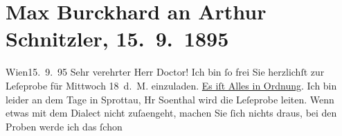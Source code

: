

         
         \renewcommand{\erwaehntePersonen}{Personen: Anna Bauer, Giuseppe Giacosa, Adolf von Sonnenthal, Fanny Walbeck}
         \renewcommand{\erwaehnteInstitutionen}{Institutionen: Burgtheater}
         \renewcommand{\erwaehnteOrte}{Orte: Sprottau, Wien}
         \renewcommand{\erwaehnteWerke}{Werke: Liebelei. Schauspiel in drei Akten, Rechte der Seele. Schauspiel in einem Act}
               \section[Max Burckhard an Arthur Schnitzler, 15. 9. 1895]{ Max Burckhard an Arthur Schnitzler, 15. 9. 1895}\nopagebreak{}\rehead{ }\begin{ledgroupsized}[t]{13cm}\normalsize\beginnumbering \toendnotes[C]{\smallbreak\pagebreak[2]} 
\toendnotes[C]{\smallbreak}\pstart
           \noindent{}{\pb}\textcolor{gray}{\textbf{\label{T_L00484-1v}\label{T_L00484-1h}}}\hfill Wien15. 9. 95\pend
           \pstart{}Sehr verehrter Herr Doctor!\pend\pstart
           Ich bin ſo frei Sie herzlichſt zur Leſeprobe für Mittwoch 18 d. M. einzuladen. \uline{Es iſt Alles in Ordnung}. Ich bin leider an dem
                    Tage in Sprottau, Hr So{\geminationn}enthal wird die Leſeprobe
                    leiten. Wenn etwas mit dem Dialect nicht zuſa{\geminationm}engeht, machen Sie ſich nichts draus, bei den Proben werde ich das ſchon

\end{ledgroupsized}
